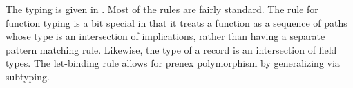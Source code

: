 \documentclass[acmsmall]{acmart}
\theoremstyle{definition}
\newtheorem{definition}{Definition}[section]
\begin{document}













The typing is given in .
Most of the rules are fairly standard. 
The rule for function typing is a bit special in that
it treats a function as a sequence of paths whose type is an intersection of implications,
rather than having a separate pattern matching rule. 
Likewise, the type of a record is an intersection of field types.
The let-binding rule allows for prenex polymorphism by generalizing via subtyping. 
\end{document}

